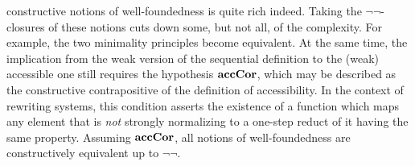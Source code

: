 constructive notions of well-foundedness is quite rich indeed.
Taking the $\lnot\lnot$-closures of
these notions cuts down some, but not all, of the complexity.
For example, the two minimality principles become equivalent.
At the same time, the implication from the weak version of the sequential definition 
to the (weak) accessible one still requires the hypothesis $\mathbf{accCor}$,
which may be described as the constructive contrapositive of the definition of accessibility.
In the context of rewriting systems,
this condition asserts the existence of a function which maps any
element that is \emph{not} strongly normalizing to a one-step reduct of it having the same property.
Assuming $\mathbf{accCor}$, all notions of well-foundedness
are constructively equivalent up to $\lnot\lnot$.

